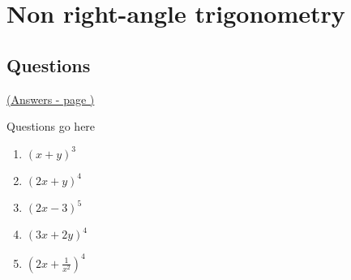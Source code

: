 \documentclass[../main.tex]{subfiles}
\begin{document}
\section{Non right-angle trigonometry}



\pagebreak
\hypertarget{nonrighttriglink}{\subsection*{Questions}}
\hyperlink{nonrighttriganswers}{(Answers - page {\pageref*{Non right trig answers}})}

\label{Non right trig}
Questions go here


\begin{enumerate}
    \item \( (x+y)^3 \)
    \item \( (2x+y)^4 \)
    \item \( (2x-3)^5 \)
    \item \( (3x+2y)^4 \)
    \item \( (2x + \frac{1}{x^2 } )^4 \)
\end{enumerate}
\end{document}
